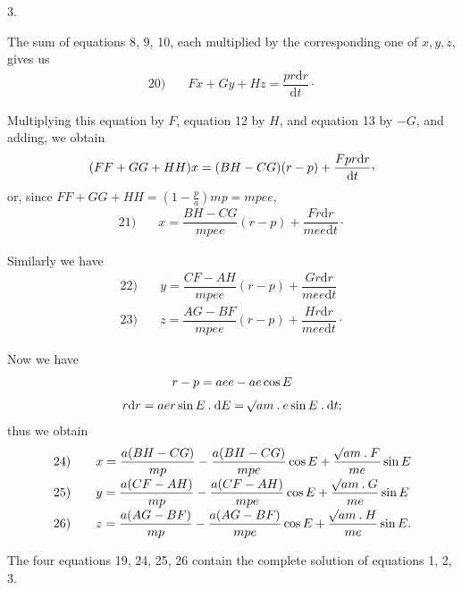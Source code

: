 \par{}\bigskip
{}
\begin{center}3.\end{center}
\noindent\hspace*{\parindent}The sum of equations 8, 9, 10, each multiplied by the corresponding one of \(x,y,z\), gives us
\[
\begin{array}{rl}20)\quad&Fx+Gy+Hz=\dfrac{pr\mathrm{d}r}{\mathrm{d}t}\mathpunct{\cdot}\end{array}
\]
\par Multiplying this equation by \(F\), equation 12 by \(H\), and equation 13 by \(-G\), and adding, we obtain
\[
(FF+GG+HH)x=(BH-CG)(r-p)+\frac{Fpr\mathrm{d}r}{\mathrm{d}t}\mathpunct{\raisebox{.45ex}{,}}
\]
or, since \(FF+GG+HH=\left(1-\frac{p}{a}\right)mp=mpee\),
\[
\begin{array}{rl}21)\quad&x=\dfrac{BH-CG}{mpee}(r-p)+\dfrac{Fr\mathrm{d}r}{mee\mathrm{d}t}\mathpunct{\cdot}\end{array}
\]
\par Similarly we have
\[
\begin{array}{rl}
22)\quad&y=\dfrac{CF-AH}{mpee}(r-p)+\dfrac{Gr\mathrm{d}r}{mee\mathrm{d}t}\\[6pt]
23)\quad&z=\dfrac{AG-BF}{mpee}(r-p)+\dfrac{Hr\mathrm{d}r}{mee\mathrm{d}t}\mathpunct{\cdot}
\end{array}
\]
\par Now we have
\[
\begin{gathered}
r-p=aee-ae\cos E\\[4pt]
r\mathrm{d}r=aer\sin E\mathbin{.}\mathrm{d}E=\mathord{{}^{}\!\surd}am\mathbin{.}e\sin E\mathbin{.}\mathrm{d}t;
\end{gathered}
\]
thus we obtain
\[
\begin{array}{rl}
24)\quad&x=\dfrac{a(BH-CG)}{mp}-\dfrac{a(BH-CG)}{mpe}\cos E+\dfrac{\mathord{{}^{}\!\surd}am\mathbin{.}F}{me}\sin E\\[7pt]
25)\quad&y=\dfrac{a(CF-AH)}{mp}-\dfrac{a(CF-AH)}{mpe}\cos E+\dfrac{\mathord{{}^{}\!\surd}am\mathbin{.}G}{me}\sin E\\[7pt]
26)\quad&z=\dfrac{a(AG-BF)}{mp}-\dfrac{a(AG-BF)}{mpe}\cos E+\dfrac{\mathord{{}^{}\!\surd}am\mathbin{.}H}{me}\sin E.
\end{array}
\]
\par The four equations 19, 24, 25, 26 contain the complete solution of equations 1, 2, 3.
